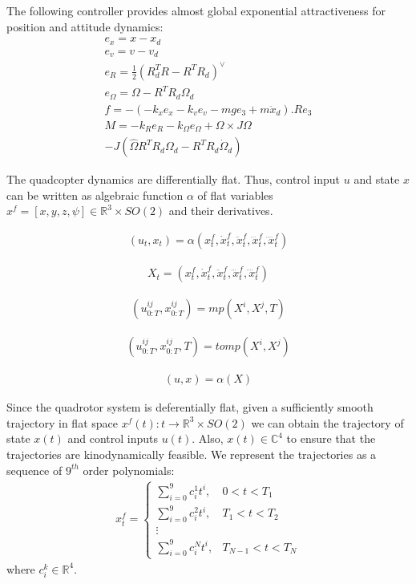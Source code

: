 \documentclass[conference]{IEEEtran}
\begin{document}
The following controller \cite{leegeometric} provides almost global exponential attractiveness for position and attitude dynamics:
\begin{gather}
    e_x = x - x_d \\
    e_v = v - v_d \\
    e_R = \frac{1}{2}(R^T_d R - R^T R_d)^{\vee} \\
    e_{\Omega} = \Omega - R^T R_d \Omega_d \\
    f = -(-k_x e_x - k_v e_v - mge_3 + m\ddot{x}_d).Re_3 \\
    \nonumber M = -k_R e_R - k_{\Omega} e_{\Omega} + \Omega \times J\Omega\\ - J (\hat{\Omega} R^T R_d \Omega_d - R^T R_d \dot{\Omega}_d)
\end{gather}

 The quadcopter dynamics are differentially flat. Thus, control input $u$ and state $x$ can be written as algebraic function $\alpha$ of flat variables $x^f = [x, y, z, \psi] \in \mathbb{R}^3 \times SO(2)$ and their derivatives.

\begin{align}
(u_t, x_t) = \alpha(x_t^f,\dot{x}_t^f,\ddot{x}_t^f,\dddot{x}_t^f,\ddddot{x}_t^f)
\end{align}

\begin{align}
X_t = (x_t^f,\dot{x}_t^f,\ddot{x}_t^f,\dddot{x}_t^f,\ddddot{x}_t^f)
\end{align}


\begin{align}
(u^{ij}_{0:T}, x^{ij}_{0:T}) = mp(X^i,X^j,T)
\end{align}

\begin{align}
(u^{ij}_{0:T}, x^{ij}_{0:T},T) = tomp(X^i,X^j)
\end{align}

\begin{align}
(u, x) = \alpha(X)
\end{align}

Since the quadrotor system is deferentially flat, given a sufficiently smooth trajectory in flat space $x^f(t): t \to \mathbb{R}^3\times SO(2)$ we can obtain the trajectory of state $x(t)$ and control inputs $u(t)$. 
Also, $x(t) \in \mathbb{C}^4$ to ensure that the trajectories are kinodynamically feasible. 
We represent the trajectories as a sequence of $9^{th}$ order polynomials:
\begin{align}
x^f_t = 
\begin{cases}
    \sum_{i=0}^9 c_i^1 t^i, & 0 < t < T_1 \\
    \sum_{i=0}^9 c_i^2 t^i, & T_1 < t < T_2 \\
    \vdots\\
    \sum_{i=0}^9 c_i^N t^i, & T_{N-1} < t < T_N
\end{cases}
\end{align}
where $c^k_i\in\mathbb{R}^4$. 
\end{document}
